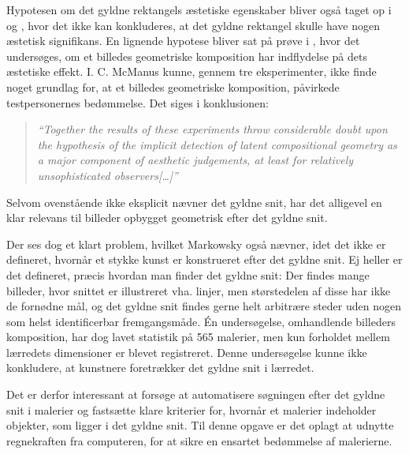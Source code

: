 {Hypotesen om det gyldne rektangels æstetiske egenskaber bliver også
taget op i \cite{Boselie1984} og \cite{Plug1980}, hvor det ikke kan
konkluderes, at det gyldne rektangel skulle have nogen æstetisk
signifikans. En lignende hypotese bliver sat på prøve i
\cite{McManus1995}, hvor det undersøges, om et billedes geometriske
komposition har indflydelse på dets æstetiske effekt. I. C. McManus
kunne, gennem tre eksperimenter, ikke finde noget grundlag for, at et
billedes geometriske komposition, påvirkede testpersonernes bedømmelse.
Det siges i konklusionen:

\begin{quote}
	\emph{``Together the results of these experiments throw
	considerable doubt upon the hypothesis of the implicit detection
	of latent compositional geometry as a major component of
	aesthetic judgements, at least for relatively unsophisticated
	observers[\dots]''}
\end{quote}

Selvom ovenstående ikke eksplicit nævner det gyldne snit, har det
alligevel en klar relevans til billeder opbygget geometrisk efter det
gyldne snit.

Der ses dog et klart problem, hvilket Markowsky også nævner, idet det
ikke er defineret, hvornår et stykke kunst er konstrueret efter det
gyldne snit. Ej heller er det defineret, præcis hvordan man finder det
gyldne snit: Der findes mange billeder, hvor snittet er illustreret vha.
linjer, men størstedelen af disse har ikke de fornødne mål, og det
gyldne snit findes gerne helt arbitrære steder uden nogen som helst
identificerbar fremgangsmåde.  Én undersøgelse, omhandlende billeders
komposition, har dog lavet statistik på 565 malerier, men kun forholdet
mellem lærredets dimensioner er blevet registreret\cite{Olariu1999}.
Denne undersøgelse kunne ikke konkludere, at kunstnere foretrækker det
gyldne snit i lærredet.

Det er derfor interessant at forsøge at automatisere søgningen efter det
gyldne snit i malerier og fastsætte klare kriterier for, hvornår et
malerier indeholder objekter, som ligger i det gyldne snit.  Til denne
opgave er det oplagt at udnytte regnekraften fra computeren, for at
sikre en ensartet bedømmelse af malerierne.

}
